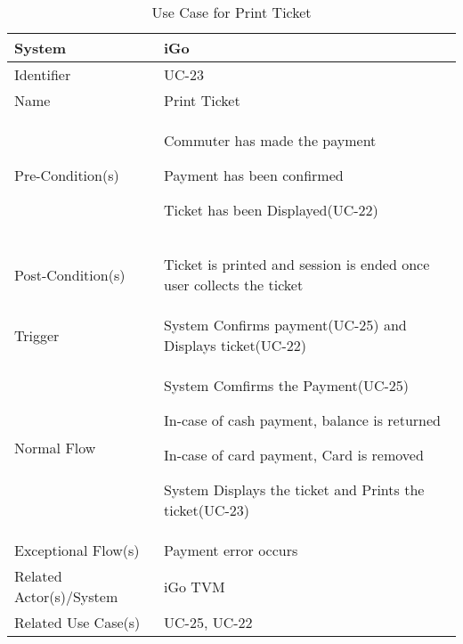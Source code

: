\begin{table}[ht]
    \centering
    \begin{tabular}{|l|p{10cm}|}
        \hline
        System & iGo\\
        \hline
        Identifier & UC-23 \\
        \hline
        Name & Print Ticket \\
        Pre-Condition(s)   & 
        \begin{enumerate*}[itemjoin=\newline]
            \item Commuter has made the payment
            \item Payment has been confirmed
            \item Ticket has been Displayed(UC-22)
        \end{enumerate*} \\
        \hline
        Post-Condition(s)  & 
        \begin{enumerate*}[itemjoin=\newline]
            \item Ticket is printed and session is ended once user collects the ticket
        \end{enumerate*} \\
        \hline
        Trigger            & System Confirms payment(UC-25) and Displays ticket(UC-22) \\
        \hline
        Normal Flow        & 
        \begin{enumerate*}[itemjoin=\newline]
            \item System Comfirms the Payment(UC-25) 
             \item In-case of cash payment, balance is returned
            \item In-case of card payment, Card is removed
            \item System Displays the ticket and Prints the ticket(UC-23)
        \end{enumerate*} \\
        \hline
        Exceptional Flow(s) & Payment error occurs \\
        \hline
         Related Actor(s)/System   &  iGo TVM \\
        \hline
        Related Use Case(s) & UC-25, UC-22\\
        \hline
    \end{tabular}
    \caption{Use Case for Print Ticket}
    \label{tab:UC_PrintTicket}
\end{table}

